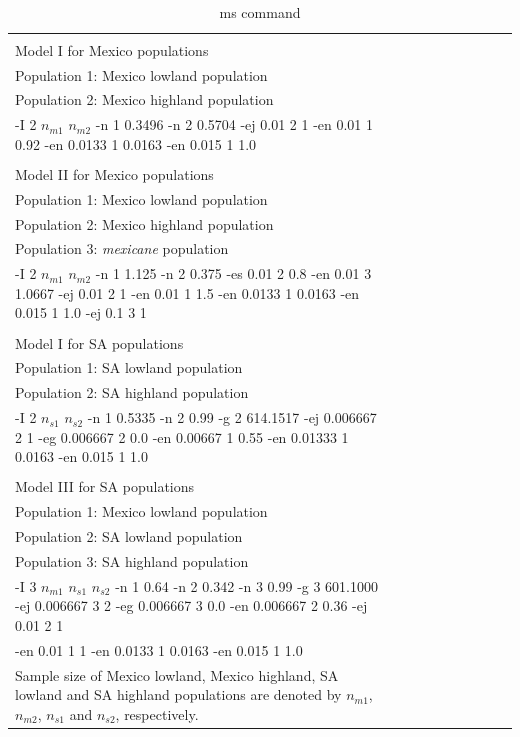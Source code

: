\renewcommand{\arraystretch}{1.1}
\begin{table}[tb]

\begin{center}
 \caption[]{ms command\hspace*{11.3cm}}
  \textbf{}\\[-2mm]
{\fontsize{7}{11}\sf
    \begin{tabular}{llcccccccl} \hline
       & & \\[-3mm]
     Model I for Mexico  populations   \\
     Population 1: Mexico lowland population   \\
     Population 2: Mexico highland population   \\
  -I 2 $n_{m1}$ $n_{m2}$ -n 1 0.3496 -n 2 0.5704 -ej 0.01 2 1 -en 0.01 1 0.92 -en 0.0133 1 0.0163 -en 0.015 1 1.0 \\ 
      \hline
    & & \\[-3mm]
     Model II for Mexico  populations   \\
     Population 1: Mexico lowland population   \\
     Population 2: Mexico highland population   \\
     Population 3: \emph{mexicane} population   \\
-I 2 $n_{m1}$ $n_{m2}$ -n 1 1.125 -n 2 0.375 -es 0.01 2 0.8 -en 0.01 3 1.0667 -ej 0.01 2 1 -en 0.01 1 1.5 -en 0.0133 1 0.0163 -en 0.015 1 1.0 -ej 0.1 3 1 \\ 
      \hline
    & & \\[-3mm]
    Model I for SA  populations   \\
     Population 1: SA lowland population   \\
     Population 2: SA highland population   \\
  -I 2 $n_{s1}$ $n_{s2}$ -n 1 0.5335 -n 2 0.99 -g 2 614.1517 -ej 0.006667 2 1 -eg 0.006667 2 0.0 -en 0.00667 1 0.55 -en 0.01333 1 0.0163 -en 0.015 1 1.0 \\ 
      \hline
    & & \\[-3mm]
    Model III for SA  populations   \\
    Population 1: Mexico lowland population   \\
     Population 2: SA lowland population   \\
     Population 3: SA highland population   \\
  -I 3 $n_{m1}$ $n_{s1}$ $n_{s2}$ -n 1 0.64 -n 2 0.342 -n 3 0.99 -g 3 601.1000 -ej 0.006667 3 2 -eg 0.006667 3 0.0 -en 0.006667 2 0.36 -ej 0.01 2 1\\
   -en 0.01 1 1 -en 0.0133 1 0.0163 -en 0.015 1 1.0 \\  [1mm]
    \hline
\multicolumn{1}{l}{Sample size of Mexico lowland, Mexico highland, SA lowland and SA highland populations are denoted by $n_{m1}$, $n_{m2}$, $n_{s1}$ and $n_{s2}$, respectively.}\\
    \end{tabular}
    \label{commandline}  %
}
\end{center}
\end{table}
